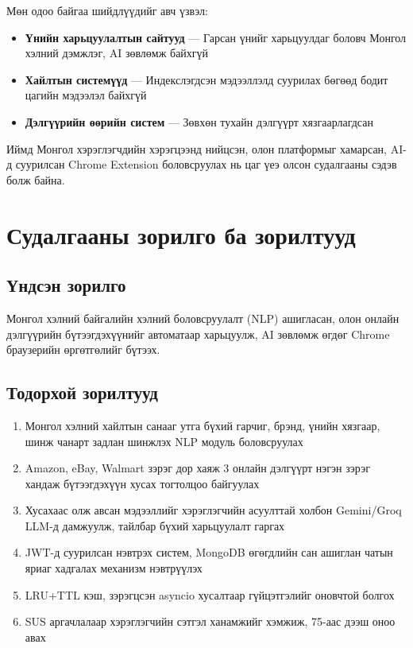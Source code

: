 \documentclass[12pt,a4paper]{report}
\begin{document}
Мөн одоо байгаа шийдлүүдийг авч үзвэл:
\begin{itemize}[leftmargin=1.5cm]
  \item \textbf{Үнийн харьцуулалтын сайтууд} --- Гарсан үнийг харьцуулдаг боловч Монгол хэлний дэмжлэг, AI зөвлөмж байхгүй
  \item \textbf{Хайлтын системүүд} --- Индекслэгдсэн мэдээллэлд суурилах бөгөөд бодит цагийн мэдээлэл байхгүй
  \item \textbf{Дэлгүүрийн өөрийн систем} --- Зөвхөн тухайн дэлгүүрт хязгаарлагдсан
\end{itemize}

Иймд Монгол хэрэглэгчдийн хэрэгцээнд нийцсэн, олон платформыг хамарсан, AI-д суурилсан Chrome Extension боловсруулах нь цаг үеэ олсон судалгааны сэдэв болж байна.

\section{Судалгааны зорилго ба зорилтууд}

\subsection*{Үндсэн зорилго}
Монгол хэлний байгалийн хэлний боловсруулалт (NLP) ашигласан, олон онлайн дэлгүүрийн бүтээгдэхүүнийг автоматаар харьцуулж, AI зөвлөмж өгдөг Chrome браузерийн өргөтгөлийг бүтээх.

\subsection*{Тодорхой зорилтууд}
\begin{enumerate}[leftmargin=1.5cm, label=\textbf{З\arabic*.}]
  \item Монгол хэлний хайлтын санааг утга бүхий гарчиг, брэнд, үнийн хязгаар, шинж чанарт задлан шинжлэх NLP модуль боловсруулах
  \item Amazon, eBay, Walmart зэрэг дор хаяж 3 онлайн дэлгүүрт нэгэн зэрэг хандаж бүтээгдэхүүн хусах тогтолцоо байгуулах
  \item Хусахаас олж авсан мэдээллийг хэрэглэгчийн асуулттай холбон Gemini/Groq LLM-д дамжуулж, тайлбар бүхий харьцуулалт гаргах
  \item JWT-д суурилсан нэвтрэх систем, MongoDB өгөгдлийн сан ашиглан чатын яриаг хадгалах механизм нэвтрүүлэх
  \item LRU+TTL кэш, зэрэгцсэн asyncio хусалтаар гүйцэтгэлийг оновчтой болгох
  \item SUS аргачлалаар хэрэглэгчийн сэтгэл ханамжийг хэмжиж, 75-аас дээш оноо авах
\end{enumerate}
\end{document}
